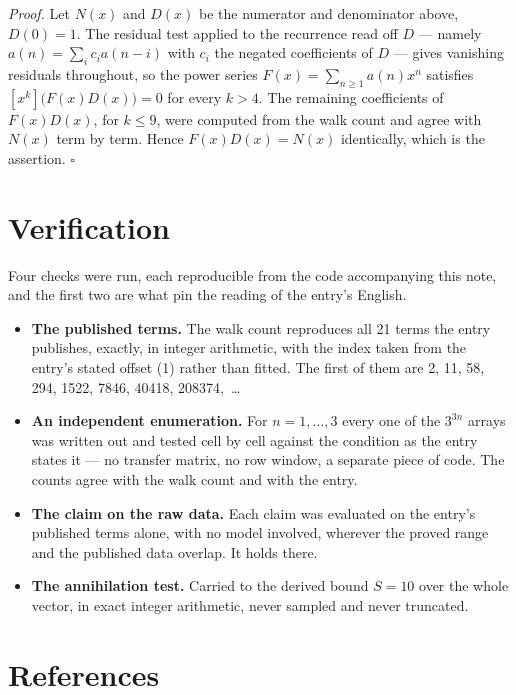 \documentclass[11pt]{article}
\theoremstyle{definition}
\begin{document}
{\itshape Proof.} Let $N(x)$ and $D(x)$ be the numerator and denominator above, $D(0)=1$. The residual test applied to the recurrence read off $D$ --- namely $a(n) = \sum_i c_i a(n-i)$ with $c_i$ the negated coefficients of $D$ --- gives vanishing residuals throughout, so the power series $F(x)=\sum_{n\ge 1}a(n)x^n$ satisfies $[x^k]\bigl(F(x)D(x)\bigr) = 0$ for every $k > 4$. The remaining coefficients of $F(x)D(x)$, for $k \le 9$, were computed from the walk count and agree with $N(x)$ term by term. Hence $F(x)D(x) = N(x)$ identically, which is the assertion. $\square$

\section{Verification}

Four checks were run, each reproducible from the code accompanying this note, and the first two are what pin the reading of the entry's English.

\begin{itemize}

\item {\bfseries The published terms.} The walk count reproduces all 21 terms the entry publishes, exactly, in integer arithmetic, with the index taken from the entry's stated offset (1) rather than fitted. The first of them are 2, 11, 58, 294, 1522, 7846, 40418, 208374,~\dots

\item {\bfseries An independent enumeration.} For $n = 1,\dots,3$ every one of the $3^{3n}$ arrays was written out and tested cell by cell against the condition as the entry states it --- no transfer matrix, no row window, a separate piece of code. The counts agree with the walk count and with the entry.

\item {\bfseries The claim on the raw data.} Each claim was evaluated on the entry's published terms alone, with no model involved, wherever the proved range and the published data overlap. It holds there.

\item {\bfseries The annihilation test.} Carried to the derived bound $S = 10$ over the whole vector, in exact integer arithmetic, never sampled and never truncated.

\end{itemize}

\section{References}
\end{document}
